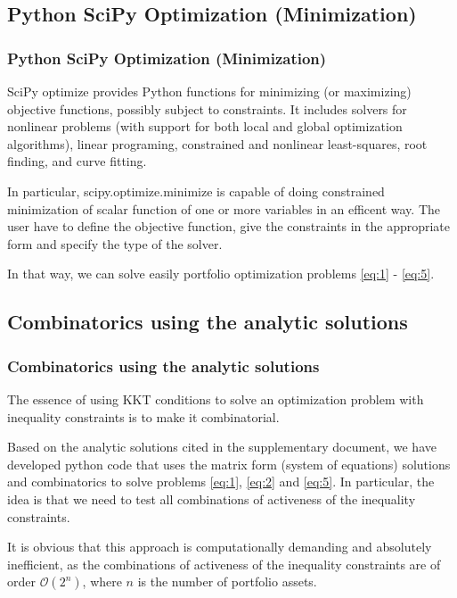 \documentclass{beamer}
\begin{document}
\subsection{Python SciPy Optimization (Minimization)}

\begin{frame}
\frametitle{\textbf{Python SciPy Optimization (Minimization)}}

\justifying
SciPy optimize provides Python functions for minimizing (or maximizing) objective functions, possibly subject to constraints. It includes solvers for nonlinear problems (with support for both local and global optimization algorithms), linear programing, constrained and nonlinear least-squares, root finding, and curve fitting.

\vspace{0.4cm}
\justifying
In particular, scipy.optimize.minimize is capable of doing constrained minimization of scalar function of one or more variables in an efficent way. The user have to define the objective function, give the constraints in the appropriate form and specify the type of the solver.

\vspace{0.4cm}
\justifying
In that way, we can solve easily portfolio optimization problems \eqref{eq:1} - \eqref{eq:5}.

\end{frame}







\subsection{Combinatorics using the analytic solutions}

\begin{frame}
\frametitle{\textbf{Combinatorics using the analytic solutions}}

\justifying
The essence of using KKT conditions to solve an optimization problem with inequality constraints is to make it combinatorial.

\vspace{0.8cm}
\justifying
Based on the analytic solutions cited in the supplementary document, we have developed python code that uses the matrix form (system of equations) solutions and combinatorics to solve problems \eqref{eq:1}, \eqref{eq:2} and \eqref{eq:5}. In particular, the idea is that we need to test all combinations of activeness of the inequality constraints.

\vspace{0.8cm}
\justifying
It is obvious that this approach is computationally demanding and absolutely inefficient, as the combinations of activeness of the inequality constraints are of order $\mathcal{O}\left(2^{n}\right)$, where $n$ is the number of portfolio assets.

\end{frame}
\end{document}
